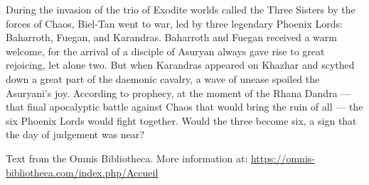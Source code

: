 During the invasion of the trio of Exodite worlds called the Three Sisters by the forces of Chaos, Biel-Tan went to war, led by three legendary Phoenix Lords: Baharroth, Fuegan, and Karandras. Baharroth and Fuegan received a warm welcome, for the arrival of a disciple of Asuryan always gave rise to great rejoicing, let alone two. But when Karandras appeared on Khazhar and scythed down a great part of the daemonic cavalry, a wave of unease spoiled the Asuryani's joy. According to prophecy, at the moment of the Rhana Dandra --- that final apocalyptic battle against Chaos that would bring the ruin of all --- the six Phoenix Lords would fight together. Would the three become six, a sign that the day of judgement was near?

Text from the Omnis Bibliotheca. More information at: \url{https://omnis-bibliotheca.com/index.php/Accueil}
